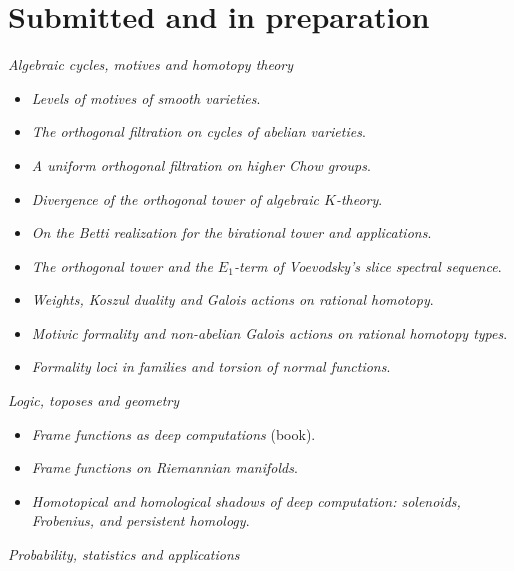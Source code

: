 \documentclass[10pt,a4paper]{article}
\begin{document}
\section{Submitted and in preparation}
\textit{Algebraic cycles, motives and homotopy theory}
\begin{itemize}
\item \emph{Levels of motives of smooth varieties}.
\item \emph{The orthogonal filtration on cycles of abelian varieties}.
\item \emph{A uniform orthogonal filtration on higher Chow groups}.
\item \emph{Divergence of the orthogonal tower of algebraic $K$-theory}.
\item \emph{On the Betti realization for the birational tower and applications}.
\item \emph{The orthogonal tower and the $E_1$-term of Voevodsky's slice spectral sequence}.
\item \emph{Weights, Koszul duality and Galois actions on rational homotopy}.
\item \emph{Motivic formality and non-abelian Galois actions on rational homotopy types}.
\item \emph{Formality loci in families and torsion of normal functions}.
\end{itemize}
\textit{Logic, toposes and geometry}
\begin{itemize}
\item \emph{Frame functions as deep computations} (book).
\item \emph{Frame functions on Riemannian manifolds}.
\item \emph{Homotopical and homological shadows of deep computation: solenoids, Frobenius, and persistent homology}.
\end{itemize}
\textit{Probability, statistics and applications}
\end{document}
